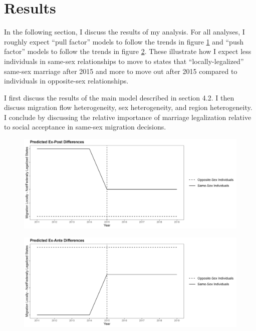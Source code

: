 \documentclass[12pt,letterpaper]{article}
\begin{document}


\clearpage
\section{Results}
In the following section, I discuss the results of my analysis. For all analyses, I roughly expect “pull factor” models to follow the trends in figure \ref{fig: ex_post_diffs} and “push factor” models to follow the trends in figure \ref{fig: ex_ante_diffs}. These illustrate how I expect less individuals in same-sex relationships to move to states that “locally-legalized” same-sex marriage after 2015 and more to move out after 2015 compared to individuals in opposite-sex relationships.

I first discuss the results of the main model described in section 4.2. I then discuss migration flow heterogeneity, sex heterogeneity, and region heterogeneity. I conclude by discussing the relative importance of marriage legalization relative to social acceptance in same-sex migration decisions.

\begin{figure}[h]
    \includegraphics[width=0.75\linewidth]{outputs/summary_stats/ex_post_diffs.png}
    \centering
    \caption{}
    \label{fig: ex_post_diffs}
\end{figure}

\begin{figure}[h]
    \centering
    \includegraphics[width=0.75\linewidth]{outputs/summary_stats/ex_ante_diffs.png}
    \caption{}
    \label{fig: ex_ante_diffs}
\end{figure}
\end{document}
